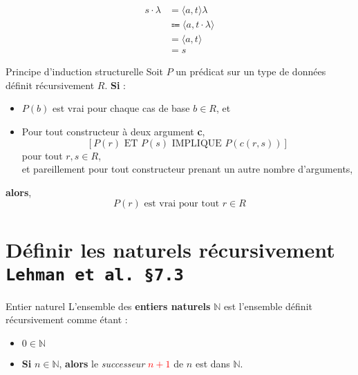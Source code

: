 \documentclass[16pt]{report}
\begin{document}
\begin{multicols*}{2}
\begin{Preuve}{}{}
        \begin{align*}
                        s \cdot \lambda &= \langle a,t \rangle \lambda  \\
                              & \Coloneqq \langle a, t \cdot \lambda \rangle \\ 
                              &= \langle a, t \rangle \\
                              &= s 
        \end{align*}
    \end{Preuve}
    
    \columnbreak
    \begin{Theorem}{Principe d'induction structurelle}{}
        Soit $P$ un prédicat sur un type de données définit récursivement $R$. \textbf{Si} :
        \begin{itemize}
            \item $P(b)$ est vrai pour chaque cas de base $b \in R$, et 
            \item Pour tout constructeur à deux argument \textbf{c}, 
                \[ \left[ P(r) \text{ ET } P(s) \text{ IMPLIQUE }  P(c(r,s)) \right] \]
            pour tout $r, s \in R$, \\ 
            et pareillement pour tout constructeur prenant un autre nombre d'arguments,     
        \end{itemize}
        \textbf{alors}, 
                        \[P(r) \text{ est vrai pour tout } r \in R \]
        
    \end{Theorem}            
    
    \section{Définir les naturels récursivement \texttt{\small{Lehman et al. \S 7.3}}}


    \begin{Definitionx}{Entier naturel}{}
        L'ensemble des \textbf{entiers naturels} $\mathbb{N}$ est l'ensemble définit récursivement comme étant :
                \begin{itemize}
                    \item $ 0 \in \mathbb{N}$ 
                    \item \textbf{Si} $n \in \mathbb{N}$, \textbf{alors} le \textit{successeur} 
                        \textcolor{red}{$n + 1$} de $n$ est dans $\mathbb{N}$. 
                \end{itemize}
    \end{Definitionx}



\end{multicols*}
\end{document}
